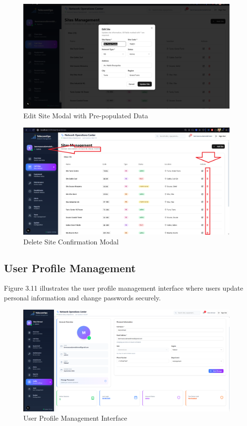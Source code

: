 \begin{figure}[H]
    \centering
    \includegraphics[width=0.85\linewidth]{img/chap_03/edit_site_modal.png}
    \caption{Edit Site Modal with Pre-populated Data}
    \label{fig:edit_site_modal}
\end{figure}

\begin{figure}[H]
    \centering
    \includegraphics[width=0.85\linewidth]{img/chap_03/delete_site_modal.png}
    \caption{Delete Site Confirmation Modal}
    \label{fig:delete_site_modal}
\end{figure}

\subsection{User Profile Management}

Figure 3.11 illustrates the user profile management interface where users update personal information and change passwords securely.

\begin{figure}[H]
    \centering
    \includegraphics[width=0.85\linewidth]{img/chap_03/profile_management.png}
    \caption{User Profile Management Interface}
    \label{fig:profile_management}
\end{figure}

